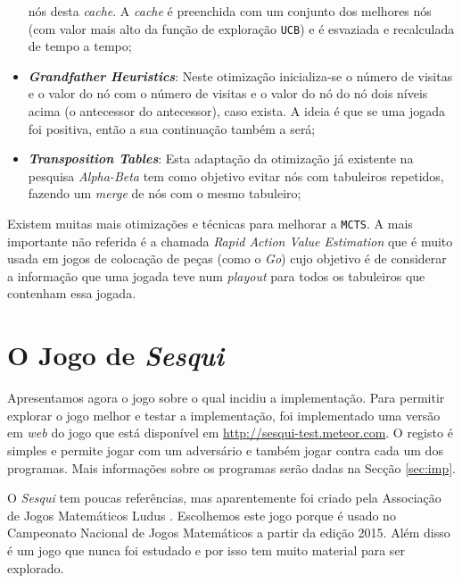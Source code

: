 \documentclass[12pt,a4paper,oneside]{article}
\begin{document}
\begin{itemize}
  nós desta \textit{cache}. A \textit{cache} é preenchida com um
  conjunto dos melhores nós (com valor mais alto da função de
  exploração \texttt{UCB}) e é esvaziada e recalculada de tempo a
  tempo;
\item \textbf{\textit{Grandfather Heuristics}}: Neste otimização
  inicializa-se o número de visitas e o valor do nó com o número de
  visitas e o valor do nó do nó dois níveis acima (o antecessor do
  antecessor), caso exista. A ideia é que se uma jogada foi positiva,
  então a sua continuação também a será;
\item \textbf{\textit{Transposition Tables}}: Esta adaptação da
  otimização já existente na pesquisa \textit{Alpha-Beta} tem como
  objetivo evitar nós com tabuleiros repetidos, fazendo um
  \textit{merge} de nós com o mesmo tabuleiro;
\end{itemize}

Existem muitas mais otimizações e técnicas para melhorar a
\texttt{MCTS}. A mais importante não referida é a chamada
\textit{Rapid Action Value Estimation} que é muito usada em jogos de
colocação de peças (como o \textit{Go}) cujo objetivo é de considerar
a informação que uma jogada teve num \textit{playout} para todos os
tabuleiros que contenham essa jogada.



\section{O Jogo de \textit{Sesqui}}
\label{sec:sesqui}

Apresentamos agora o jogo sobre o qual incidiu a implementação. Para
permitir explorar o jogo melhor e testar a implementação, foi
implementado uma versão em \textit{web} do jogo que está disponível em
\url{http://sesqui-test.meteor.com}. O registo é simples e permite
jogar com um adversário e também jogar contra cada um dos
programas. Mais informações sobre os programas serão dadas na Secção
\ref{sec:imp}.

O \textit{Sesqui} tem poucas referências, mas aparentemente foi criado
pela Associação de Jogos Matemáticos Ludus
\cite{Ludus:2014}. Escolhemos este jogo porque é usado no Campeonato
Nacional de Jogos Matemáticos \cite{Ludus:2014b} a partir da edição
2015. Além disso é um jogo que nunca foi estudado e por isso tem muito
material para ser explorado.
\end{document}
